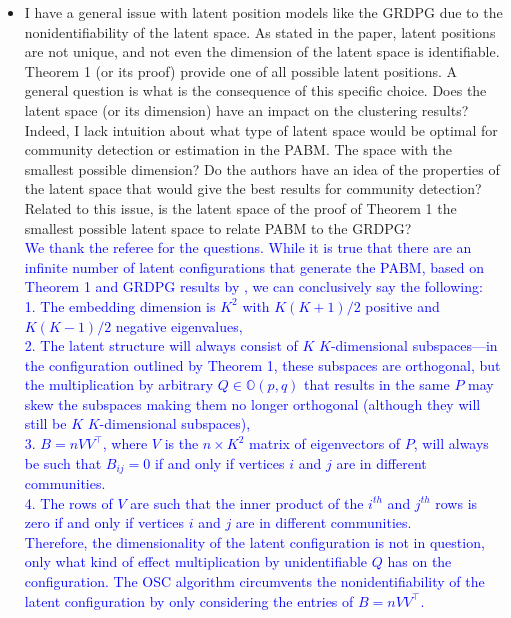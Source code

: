 \documentclass[
]{article}
\begin{document}
\begin{itemize}
\item
  I have a general issue with latent position models like the GRDPG due
  to the nonidentifiability of the latent space. As stated in the paper,
  latent positions are not unique, and not even the dimension of the
  latent space is identifiable. Theorem 1 (or its proof) provide one of
  all possible latent positions. A general question is what is the
  consequence of this specific choice. Does the latent space (or its
  dimension) have an impact on the clustering results? Indeed, I lack
  intuition about what type of latent space would be optimal for
  community detection or estimation in the PABM. The space with the
  smallest possible dimension? Do the authors have an idea of the
  properties of the latent space that would give the best results for
  community detection? Related to this issue, is the latent space of the
  proof of Theorem 1 the smallest possible latent space to relate PABM
  to the GRDPG?\\
  \textcolor{blue}{
  We thank the referee for the questions. 
  While it is true that there are an infinite number of latent configurations that generate the PABM, based on Theorem 1 and GRDPG results by \citet{rubindelanchy2017statistical}, we can conclusively say the following: 
  \\1. The embedding dimension is $K^2$ with $K (K + 1) / 2$ positive and $K (K - 1) / 2$ negative eigenvalues, 
  \\2. The latent structure will always consist of $K$ $K$-dimensional subspaces---in the configuration outlined by Theorem 1, these subspaces are orthogonal, but the multiplication by arbitrary $Q \in \mathbb{O}(p, q)$ that results in the same $P$ may skew the subspaces making them no longer orthogonal (although they will still be $K$ $K$-dimensional subspaces), 
  \\3. $B = n V V^\top$, where $V$ is the $n \times K^2$ matrix of eigenvectors of $P$, will always be such that $B_{ij} = 0$ if and only if vertices $i$ and $j$ are in different communities. 
  \\4. The rows of $V$ are such that the inner product of the $i^{th}$ and $j^{th}$ rows is zero if and only if vertices $i$ and $j$ are in different communities. 
  }\\
  \textcolor{blue}{
  Therefore, the dimensionality of the latent configuration is not in question, only what kind of effect multiplication by unidentifiable $Q$ has on the configuration. 
  The OSC algorithm circumvents the nonidentifiability of the latent configuration by only considering the entries of $B = n V V^\top$. 
}
\end{itemize}
\end{document}
